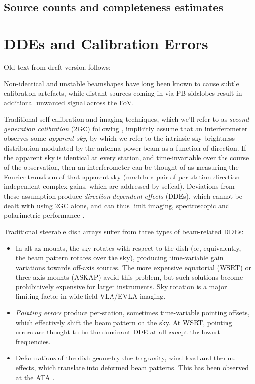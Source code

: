 \documentclass{aa}
\begin{document}
\subsection{Source counts and completeness estimates}
\label{sec:source-counts}


\section{DDEs and Calibration Errors}
\label{sec:dde}

Old text from draft version follows:

Non-identical and unstable beamshapes have long been known to cause subtle calibration artefacts, while distant sources coming in via PB sidelobes result in additional unwanted signal across the FoV. 

Traditional self-calibration and imaging techniques, which we'll refer to as {\em second-generation calibration} (2GC) following \citet{meqtrees}, implicitly assume that an interferometer observes some {\em apparent sky}, by which we refer to the intrinsic sky brightness distribution modulated by the antenna power beam as a function of direction. If the apparent sky is identical at every station, and time-invariable over the course of the observation, then an interferometer can be thought of as measuring the Fourier transform of that apparent sky (modulo a pair of per-station direction-independent complex gains, which are addressed by selfcal). Deviations from these assumption produce {\em direction-dependent effects} (DDEs), which cannot be dealt with using 2GC alone, and can thus limit imaging, spectroscopic and polarimetric performance \citep[see][for an overview]{RRIME2}. 

Traditional steerable dish arrays suffer from three types of beam-related DDEs:

\begin{itemize}
  \item In alt-az mounts, the sky rotates with respect to the dish (or, equivalently, the beam pattern rotates over the sky), producing time-variable gain variations towards off-axis sources. The more expensive equatorial (WSRT) or three-axis mounts (ASKAP) avoid this problem, but such solutions become prohibitively expensive for larger instruments. Sky rotation is a major limiting factor in wide-field VLA/EVLA imaging.

  \item \emph{Pointing errors} produce per-station, sometimes time-variable pointing offsets, which effectively shift the beam pattern on the sky. At WSRT, pointing errors are thought to be the dominant DDE at all except the lowest frequencies.

  \item Deformations of the dish geometry due to gravity, wind load and thermal effects, which translate into deformed beam patterns. This has been observed at the ATA \citep{Harp:ATA:deformations}. 
\end{itemize}
\end{document}
